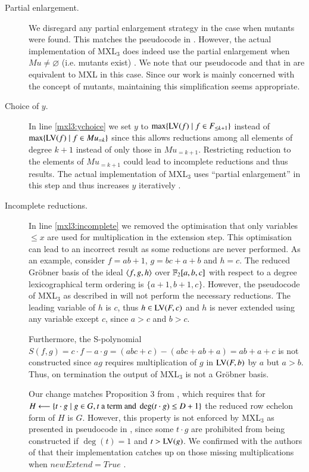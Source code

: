 \begin{description}
\item[Partial enlargement.] We disregard any partial enlargement strategy in the case when mutants were found. This matches the pseudocode in \cite{mxl3}. However, the actual implementation of MXL$_3$ does indeed use the partial enlargement when $Mu\neq \varnothing$ (i.e. mutants exist) \cite{mxl3-implementation}. We note that our pseudocode and that in \cite{mxl} are equivalent to MXL \cite{mxl} in this case. Since our work is mainly concerned with the concept of mutants, maintaining this simplification seems appropriate.

\item[Choice of $y$.] In line \ref{mxl3:ychoice} we set $y$ to  $\max\{\textsc{LV}(f)  \mid  f \in F_{\leq k+1}\}$ instead of $\max\{\textsc{LV}(f)  \mid  f \in Mu_{=k}\}$ since this allows reductions among all elements of degree $k+1$ instead of only those in $Mu_{=k+1}$. Restricting reduction to the elements of $Mu_{=k+1}$ could lead to incomplete reductions and thus results. The actual implementation of MXL$_3$ uses ``partial enlargement'' in this step and thus increases $y$ iteratively \cite{mxl3-implementation}.

\item[Incomplete reductions.] In line \ref{mxl3:incomplete} we removed the optimisation that only variables $\leq x$ are used for multiplication in the extension step. This optimisation can lead to an incorrect result as some reductions are never performed. As an example, consider $f = ab + 1$, $g = bc + a + b$ and $h = c$. The reduced Gr\"obner basis of the ideal $\langle f,g,h\rangle$ over ${\mathbb F}_2[a,b,c]$ with respect to a degree lexicographical term ordering is $\{a + 1, b + 1, c\}$. However, the pseudocode of MXL$_3$ as described in \cite{mxl3} will not perform the necessary reductions. The leading variable of $h$ is $c$, thus $h \in \textsc{LV}(F,c)$ and $h$ is never extended using any variable except $c$, since $a>c$ and $b>c$. 

Furthermore, the S-polynomial $S(f,g) = c\cdot f - a\cdot g = (abc + c) - (abc + ab + a) = ab + a + c$ is not constructed since $ag$ requires multiplication of $g$ in $\textsc{LV}(F,b)$ by $a$ but $a>b$. Thus, on termination the output of MXL$_3$ is not a Gr\"obner basis. 

Our change matches Proposition 3 from \cite{mxl3}, which requires that for $H \longleftarrow \{t\cdot g \mid g \in G, t \textnormal{ a term and } \deg(t\cdot g) \leq D +1\}$ the reduced row echelon form of $H$ is $G$. However, this property is not enforced by MXL$_3$ as presented in pseudocode in \cite{mxl3}, since some $t \cdot g$ are prohibited from being constructed if $\deg(t) = 1$ and $t > \textsc{LV}(g)$. We confirmed with the authors of \cite{mxl3} that their implementation catches up on those missing multiplications when $newExtend = True$ \cite{mxl3-implementation}.
\end{description}

